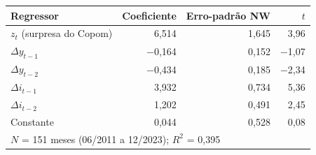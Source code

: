 \begin{tabular}{lrrr}
\toprule
Regressor & Coeficiente & Erro-padrão NW & $t$ \\
\midrule
$z_t$ (surpresa do Copom) & 6{,}514 & 1{,}645 & 3{,}96 \\
$\Delta y_{t-1}$ & \ensuremath{-}0{,}164 & 0{,}152 & \ensuremath{-}1{,}07 \\
$\Delta y_{t-2}$ & \ensuremath{-}0{,}434 & 0{,}185 & \ensuremath{-}2{,}34 \\
$\Delta i_{t-1}$ & 3{,}932 & 0{,}734 & 5{,}36 \\
$\Delta i_{t-2}$ & 1{,}202 & 0{,}491 & 2{,}45 \\
Constante & 0{,}044 & 0{,}528 & 0{,}08 \\
\midrule
\multicolumn{4}{l}{$N$ = 151 meses (06/2011 a 12/2023); $R^2$ = 0{,}395} \\
\bottomrule
\end{tabular}
